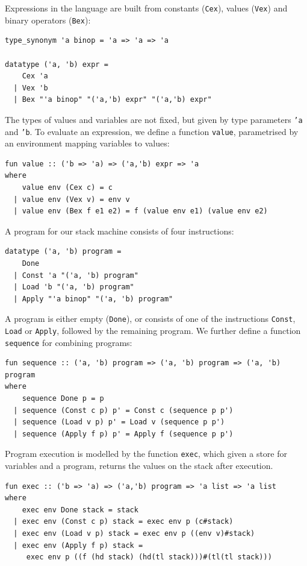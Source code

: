 Expressions in the language are built from constants (\texttt{Cex}), values (\texttt{Vex}) and binary operators (\texttt{Bex}): 
\begin{small}
\begin{verbatim}
type_synonym 'a binop = 'a => 'a => 'a

datatype ('a, 'b) expr =
    Cex 'a 
  | Vex 'b 
  | Bex "'a binop" "('a,'b) expr" "('a,'b) expr"
\end{verbatim}
\end{small}
The types of values and variables are not fixed, but given by type parameters \texttt{'a} and \texttt{'b}.
To evaluate an expression, we define a function \texttt{value}, parametrised by an environment mapping variables to values:
\begin{small}
\begin{verbatim}
fun value :: ('b => 'a) => ('a,'b) expr => 'a
where
    value env (Cex c) = c 
  | value env (Vex v) = env v
  | value env (Bex f e1 e2) = f (value env e1) (value env e2)
\end{verbatim}
\end{small}
A program for our stack machine consists of four instructions:
\begin{small}
\begin{verbatim}
datatype ('a, 'b) program =
    Done
  | Const 'a "('a, 'b) program"
  | Load 'b "('a, 'b) program"
  | Apply "'a binop" "('a, 'b) program"
\end{verbatim}
\end{small}
A program is either empty (\texttt{Done}), or consists of one of the instructions \texttt{Const}, \texttt{Load} or \texttt{Apply}, followed by the remaining program. We further define a function \texttt{sequence} for combining programs:
\begin{small}
\begin{verbatim}
fun sequence :: ('a, 'b) program => ('a, 'b) program => ('a, 'b) program
where
    sequence Done p = p
  | sequence (Const c p) p' = Const c (sequence p p')
  | sequence (Load v p) p' = Load v (sequence p p')
  | sequence (Apply f p) p' = Apply f (sequence p p') 
\end{verbatim}
\end{small}
Program execution is modelled by the function \texttt{exec}, which given a store for variables and a program, returns the values on the stack after execution.
\begin{small}
\begin{verbatim}
fun exec :: ('b => 'a) => ('a,'b) program => 'a list => 'a list
where
    exec env Done stack = stack
  | exec env (Const c p) stack = exec env p (c#stack)
  | exec env (Load v p) stack = exec env p ((env v)#stack)
  | exec env (Apply f p) stack =
     exec env p ((f (hd stack) (hd(tl stack)))#(tl(tl stack)))
\end{verbatim}
\end{small}

